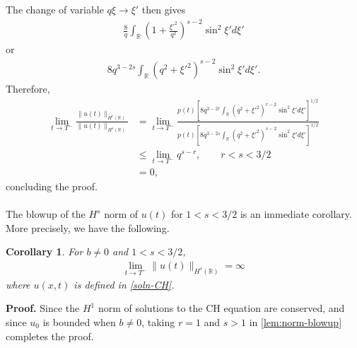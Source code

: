 \documentclass[12pt,reqno]{amsart}
\numberwithin{equation}{section}  %
\numberwithin{figure}{section}
\newcommand{\rr}{\mathbb{R}}
\theoremstyle{plain}  %
\newtheorem{corollary}{Corollary}
\theoremstyle{definition}
\begin{document}
%
%
The change of variable $q \xi \to \xi'$ then gives
%
%
\begin{equation*}
  \begin{split}
    \frac{8}{q} \int_{\rr} \left( 1 + \frac{\xi'^2}{q^2} \right)^{s-2}
    \sin^2\xi' d \xi'
  \end{split}
\end{equation*}
or
\begin{equation}
  \label{3h}
  \begin{split}
    8 q^{3 - 2s} \int_{\rr} \left( q^2 + \xi'^2 \right)^{s-2} \sin^2\xi' d \xi'. 
  \end{split}
\end{equation}
%
%
Therefore,
%
%
\begin{equation*}
  \begin{split}
    \lim_{t \to T^{-}}
    \frac{\|u(t)\|_{H^r(\rr)}}{\|u(t)\|_{H^{s}(\rr)}}
    & = \lim_{t \to T^{-}}
    \frac{ p(t) \left[ 8 q^{3 - 2r} \int_{\rr} \left( q^2 + \xi'^2 \right)^{r-2}
    \sin^2\xi'
    d \xi' \right]^{1/2}}{ p(t) \left[8 q^{3 - 2s}
    \int_{\rr} \left( q^2 + \xi'^2 \right)^{s-2} \sin^2\xi'd
    \xi'\right]^{1/2}}
    \\
    & \le \lim_{t \to T^{-}} q^{s-r}, \qquad r < s < 3/2
    \\
    & = 0,
  \end{split}
\end{equation*}
%
%
%
%
concluding the proof. \qquad \qedsymbol
\\
\\
The blowup of the $H^s$ norm of $u(t)$ for $1 < s < 3/2$ is an immediate
corollary. More precisely, we have the following.
%
%
%
%
%
%
%
%
\begin{corollary}
  \label{cor:h1-cons-rest-blowup}
  For $b \neq 0$ and $1 < s < 3/2$,
  \begin{equation*}
    \begin{split}
      \lim_{t \to T^{-}} \|u(t)\|_{H^s(\rr)} = \infty
    \end{split}
  \end{equation*}
  where $u(x,t)$ is defined in \eqref{soln-CH}.
\end{corollary}
%
%
{\bf Proof.} Since the $H^1$ norm of solutions to the CH equation are conserved, and since
$u_0$ is bounded when $b \neq 0$, taking $r = 1$ and $s >1$ in
\autoref{lem:norm-blowup} completes the proof. \qquad \qedsymbol
%
%
%
%
\end{document}
